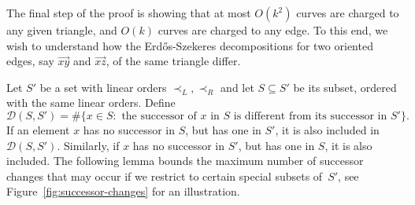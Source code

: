 \documentclass[11pt]{amsart}
\theoremstyle{definition}
\newcommand{\cD}{\mathcal{D}}
\begin{document}
The final step of the proof is showing that at most $O(k^2)$ curves are charged to any given triangle, and $O(k)$ curves are charged to any edge. To this end, we wish to understand how the Erd\H{o}s-Szekeres decompositions for two oriented edges, say $\vec{xy}$ and $\vec{xz}$, of the same triangle differ.

Let $S'$ be a set with linear orders $\prec_L, \prec_R$ and let $S\subseteq S'$ be its subset, ordered with the same linear orders. Define
$$\cD(S,S')=\#\{x\in S:\text{ the successor of $x$ in $S$ is different from its successor in $S'$}\}.$$
If an element $x$ has no successor in $S$, but has one in $S'$, it is also included in $\cD(S, S')$. Similarly, if $x$ has no successor in $S'$, but has one in $S$, it is also included. The following lemma bounds the maximum number of successor changes that may occur if we restrict to certain special subsets of~$S'$, see Figure~\ref{fig:successor-changes} for an illustration.
\end{document}
